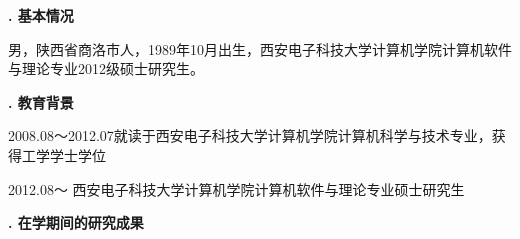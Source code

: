 \begin{authorintro}

{
    \bf\songti{}
    . 基本情况
}

男，陕西省商洛市人，1989年10月出生，西安电子科技大学计算机学院计算机软件与理论专业2012级硕士研究生。

{
    \bf\songti{}
    . 教育背景
}

2008.08～2012.07\quad\quad 就读于西安电子科技大学计算机学院计算机科学与技术专业，获得工学学士学位

2012.08～\hspace{2.2cm}       西安电子科技大学计算机学院计算机软件与理论专业硕士研究生



{
    \bf\songti{}
    . 在学期间的研究成果
}

\end{authorintro}


